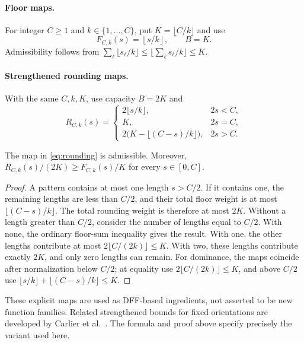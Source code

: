 \paragraph{Floor maps.}
For integer $C\geq1$ and $k\in\{1,\ldots,C\}$, put
$K=\lfloor C/k\rfloor$ and use
\begin{equation}
 F_{C,k}(s)=\left\lfloor s/k\right\rfloor,
 \qquad B=K.                                                   \label{eq:floor}
\end{equation}
Admissibility follows from
$\sum_\ell\lfloor s_\ell/k\rfloor\leq
\lfloor\sum_\ell s_\ell/k\rfloor\leq K$.

\paragraph{Strengthened rounding maps.}
With the same $C,k,K$, use capacity $B=2K$ and
\begin{equation}
 R_{C,k}(s)=
 \begin{cases}
 2\lfloor s/k\rfloor,&2s<C,\\
 K,&2s=C,\\
 2\bigl(K-\lfloor(C-s)/k\rfloor\bigr),&2s>C.
 \end{cases}                                                   \label{eq:rounding}
\end{equation}
\begin{proposition}
The map in \eqref{eq:rounding} is admissible. Moreover,
$R_{C,k}(s)/(2K)\geq F_{C,k}(s)/K$ for every $s\in[0,C]$.
\end{proposition}
\begin{proof}
A pattern contains at most one length $s>C/2$. If it contains one,
the remaining lengths are less than $C/2$, and their total floor
weight is at most $\lfloor(C-s)/k\rfloor$. The total rounding weight
is therefore at most $2K$. Without a length greater than $C/2$,
consider the number of lengths equal to $C/2$. With none, the ordinary
floor-sum inequality gives the result. With one, the other lengths
contribute at most $2\lfloor C/(2k)\rfloor\leq K$. With two, these
lengths contribute exactly $2K$, and only zero lengths can remain.
For dominance, the maps coincide after normalization below $C/2$;
at equality use $2\lfloor C/(2k)\rfloor\leq K$, and above $C/2$ use
$\lfloor s/k\rfloor+\lfloor(C-s)/k\rfloor\leq K$.
\end{proof}
These explicit maps are used as DFF-based ingredients, not asserted
to be new function families. Related strengthened bounds for fixed
orientations are developed by Carlier et al.~\cite{CarlierEtAl2007}.
The formula and proof above specify precisely the variant used here.

